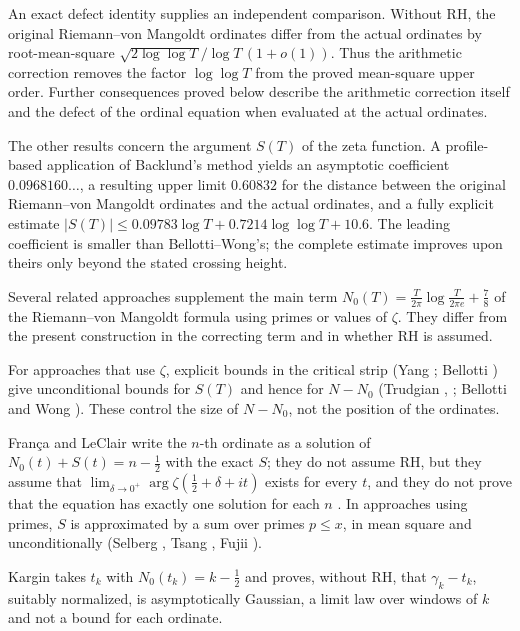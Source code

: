\documentclass[11pt,a4paper]{article}
\makeatletter
\numberwithin{equation}{section}
\DeclareRobustCommand{\CGcite}[2][]{\if\relax\detokenize{#1}\relax\cite{#2}\else\cite[#1]{#2}\fi}
\newcommand{\CG@getbib}[1]{\@ifundefined{CGBib@#1}{#1}{\csname CGBib@#1\endcsname}}
\DeclareRobustCommand{\CGcite}[2][]{\pdftooltip{\if\relax\detokenize{#1}\relax\cite{#2}\else\cite[#1]{#2}\fi}{\CG@getbib{#2}}}
\theoremstyle{definition}
\theoremstyle{remark}
\newcommand{\Nz}{N_0} %
\makeatother
\begin{document}
An exact defect identity supplies an independent comparison. Without RH, the original Riemann--von Mangoldt ordinates differ from the actual ordinates by root-mean-square $\sqrt{2\log\log T}/\log T\,(1+o(1))$. Thus the arithmetic correction removes the factor $\log\log T$ from the proved mean-square upper order. Further consequences proved below describe the arithmetic correction itself and the defect of the ordinal equation when evaluated at the actual ordinates.

The other results concern the argument $S(T)$ of the zeta function. A profile-based application of Backlund's method yields an asymptotic coefficient $0.0968160\ldots$, a resulting upper limit $0.60832$ for the distance between the original Riemann--von Mangoldt ordinates and the actual ordinates, and a fully explicit estimate $|S(T)|\le0.09783\log T+0.7214\log\log T+10.6$. The leading coefficient is smaller than Bellotti--Wong's; the complete estimate improves upon theirs only beyond the stated crossing height.

Several related approaches supplement the main term $\Nz(T)=\frac{T}{2\pi}\log\frac{T}{2\pi e}+\frac78$ of the Riemann--von Mangoldt formula using primes or values of $\zeta$. They differ from the present construction in the correcting term and in whether RH is assumed.

For approaches that use $\zeta$, explicit bounds in the critical strip (Yang \CGcite{Yang2024}; Bellotti \CGcite{Bellotti2024}) give unconditional bounds for $S(T)$ and hence for $N-\Nz$ (Trudgian \CGcite{Trudgian2012}, \CGcite{Trudgian2014}; Bellotti and Wong \CGcite[Thm.~1.1, Cor.~1.5]{BellottiWong2025}). These control the size of $N-\Nz$, not the position of the ordinates.

Fran\c{c}a and LeClair \CGcite[eq.~(20)]{FrancaLeClair2015} write the $n$-th ordinate as a solution of $\Nz(t)+S(t)=n-\frac12$ with the exact $S$; they do not assume RH, but they assume that $\lim_{\delta\to0^+}\arg\zeta(\frac12+\delta+it)$ exists for every $t$, and they do not prove that the equation has exactly one solution for each $n$ \CGcite[\S9]{FrancaLeClair2015}. In approaches using primes, $S$ is approximated by a sum over primes $p\le x$, in mean square and unconditionally (Selberg \CGcite{Selberg1946a}, Tsang \CGcite{Tsang1984}, Fujii \CGcite{Fujii1974}).

Kargin \CGcite[Thm.~1.1]{Kargin2013} takes $t_k$ with $\Nz(t_k)=k-\frac12$ and proves, without RH, that $\gamma_k-t_k$, suitably normalized, is asymptotically Gaussian, a limit law over windows of $k$ and not a bound for each ordinate.
\end{document}
